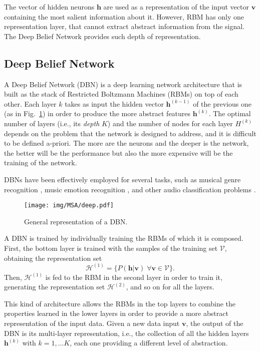 The vector of hidden neurons $\mathbf{h}$ are used as a representation of the input vector $\mathbf{v}$ containing the most salient information about it. However, RBM has only one representation layer, that cannot extract abstract information from the signal. The Deep Belief Network provides such depth of representation.

\subsection{Deep Belief Network}
A Deep Belief Network (DBN) \cite{Hinton2006} is a deep learning network architecture that is built as the stack of Restricted Boltzmann Machines (RBMs) on top of each other. Each layer $k$ takes as input the hidden vector $\mathbf{h}^{(k-1)}$ of the previous one (as in Fig.~\ref{fig:LLFs:DBN}) in order to produce the more abstract features $\mathbf{h}^{(k)}$. The optimal number of layers (i.e., its \textit{depth} $K$) and the number of nodes for each layer $H^{(k)}$ depends on the problem that the network is designed to address, and it is difficult to be defined a-priori. The more are the neurons and the deeper is the network, the better will be the performance but also the more expensive will be the training of the network.

DBNs have been effectively employed for several tasks, such as musical genre recognition \cite{Hamel2010}, music emotion recognition \cite{Schmidt2011}, and other audio classification problems \cite{Humphrey2013}. 
\begin{figure}[tbp]
  \centering
  \texttt{[image: img/MSA/deep.pdf]}
  \caption{General representation of a DBN.}
    \label{fig:LLFs:DBN}
\end{figure} 

A DBN is trained by individually training the RBMs of which it is composed. First, the bottom layer is trained with the samples of the training set $\mathcal{V}$, obtaining the representation set
$$\mathcal{H}^{(1)}=\{P(\mathbf{h}|\mathbf{v}) \; \forall \mathbf{v} \in \mathcal{V}\}.$$ 
Then, $\mathcal{H}^{(1)}$ is fed to the RBM in the second layer in order to train it, generating the representation set $\mathcal{H}^{(2)}$, and so on for all the layers. 

This kind of architecture allows the RBMs in the top layers to combine the properties learned in the lower layers in order to provide a more abstract representation of the input data. Given a new data input $\mathbf{v}$, the output of the DBN is its multi-layer representation, i.e., the collection of all the hidden layers  $\mathbf{h}^{(k)}$ with $k=1,...K$, each one providing a different level of abstraction.

